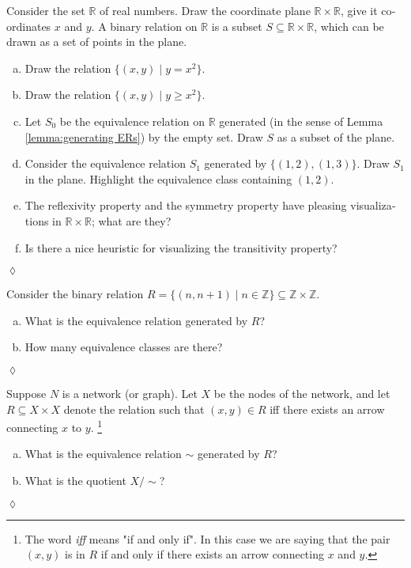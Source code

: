 \documentclass{book}
\def\ZZ{{\mathbb Z}}
\def\RR{{\mathbb R}}
\def\ss{\subseteq}
\def\|{{\;|\;}}
\theoremstyle{theoremENG}
\theoremstyle{lemmaENG}
\theoremstyle{propositionENG}
\theoremstyle{corollaryENG}
\theoremstyle{factENG}
\theoremstyle{remarkENG}
\newtheorem{remarkENG}[subsubsection]{\begin{english}Remark\end{english}}
\theoremstyle{exampleENG}
\theoremstyle{warningENG}
\theoremstyle{questionENG}
\theoremstyle{guessENG}
\theoremstyle{answerENG}
\theoremstyle{constructionENG}
\theoremstyle{rulesENG}
\theoremstyle{excENG}
\newtheorem{excENG}[subsubsection]{\begin{english}Exercise\end{english}}
\theoremstyle{appENG}
\theoremstyle{definitionENG}
\theoremstyle{notationENG}
\theoremstyle{conjectureENG}
\theoremstyle{postulateENG}
\newenvironment{exerciseENG}{\begin{excENG}}{\hspace*{\fill}$\lozenge$\end{excENG}}
\theoremstyle{theoremRUS}
\theoremstyle{lemmaRUS}
\theoremstyle{propositionRUS}
\theoremstyle{corollaryRUS}
\theoremstyle{factRUS}
\theoremstyle{remarkRUS}
\theoremstyle{exampleRUS}
\theoremstyle{warningRUS}
\theoremstyle{questionRUS}
\theoremstyle{guessRUS}
\theoremstyle{answerRUS}
\theoremstyle{constructionRUS}
\theoremstyle{rulesRUS}
\theoremstyle{excRUS}
\theoremstyle{appRUS}
\theoremstyle{definitionRUS}
\theoremstyle{notationRUS}
\theoremstyle{conjectureRUS}
\theoremstyle{postulateRUS}
\def\sexc{\begin{enumerate}[a.)]\setlength{\itemsep}{.1cm}\setlength{\parskip}{.1cm}\item}
\def\next{\item}
\def\endsexc{\end{enumerate}}
\begin{document}
\begin{english}
\begin{remarkENG}
\begin{russian} \end{russian}

\end{remarkENG}

\begin{exerciseENG}

Consider the set $\RR$ of real numbers. Draw the coordinate plane $\RR\times\RR$, give it coordinates $x$ and $y$. A binary relation on $\RR$ is a subset $S\ss\RR\times\RR$, which can be drawn as a set of points in the plane. 
\sexc Draw the relation $\{(x,y)\|y=x^2\}$. 
\next Draw the relation $\{(x,y)\|y\geq x^2\}.$
\next Let $S_0$ be the equivalence relation on $\RR$ generated (in the sense of Lemma \ref{lemma:generating ERs}) by the empty set. Draw $S$ as a subset of the plane.
\next Consider the equivalence relation $S_1$ generated by $\{(1,2),(1,3)\}$. Draw $S_1$ in the plane. Highlight the equivalence class containing $(1,2)$.
\next The reflexivity property and the symmetry property have pleasing visualizations in $\RR\times\RR$; what are they? 
\next Is there a nice heuristic for visualizing the transitivity property?
\endsexc

\begin{russian} \end{russian}

\end{exerciseENG}

\begin{exerciseENG}

Consider the binary relation $R=\{(n,n+1)\|n\in\ZZ\}\ss\ZZ\times\ZZ$. 
\sexc What is the equivalence relation generated by $R$? 
\next How many equivalence classes are there?
\endsexc

\begin{russian} \end{russian}

\end{exerciseENG}

\begin{exerciseENG}

Suppose $N$ is a network (or graph). Let $X$ be the nodes of the network, and let $R\ss X\times X$ denote the relation such that $(x,y)\in R$ iff there exists an arrow connecting $x$ to $y$.
\footnote{The word {\em iff} means "if and only if". In this case we are saying that the pair $(x,y)$ is in $R$ if and only if there exists an arrow connecting $x$ and $y$.}
\sexc What is the equivalence relation $\sim$ generated by $R$? 
\next What is the quotient $X/\sim$?
\endsexc


\end{exerciseENG}
\end{english}
\end{document}
